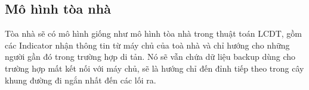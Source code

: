 \documentclass{article}
\begin{document}
    \subsection{Mô hình tòa nhà}
    Tòa nhà sẽ có mô hình giống như mô hình tòa nhà trong thuật toán 
    LCDT, gồm các Indicator nhận thông tin từ máy chủ của toà nhà 
    và chỉ hướng cho những người gần đó trong trường hợp di tản. Nó 
    sẽ vẫn chứa dữ liệu backup dùng cho trường hợp mất kết nối với máy 
    chủ, sẽ là hướng chỉ đến đỉnh tiếp theo trong cây khung đường đi 
    ngắn nhất đến các lối ra. 
    


    
\end{document}
